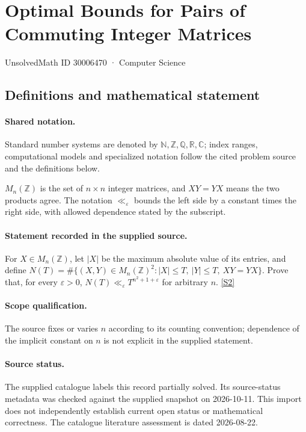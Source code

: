 \documentclass[11pt]{article}
\newcommand{\sref}[2]{\hyperlink{source:#1:#2}{[S#2]}}
\begin{document}
\setcounter{section}{30006469}
\section{Optimal Bounds for Pairs of Commuting Integer Matrices}\label{30006470}
{\small\sffamily UnsolvedMath ID 30006470 · Computer Science}
\subsection{Definitions and mathematical statement}

\paragraph{Shared notation.}Standard number systems are denoted by $\mathbb N,\mathbb Z,\mathbb Q,\mathbb R,\mathbb C$; index ranges, computational models and specialized notation follow the cited problem source and the definitions below.


$M_n(\mathbb Z)$ is the set of $n\times n$ integer matrices, and $XY=YX$ means the two products agree. The notation $\ll_\varepsilon$ bounds the left side by a constant times the right side, with allowed dependence stated by the subscript.
\paragraph{Statement recorded in the supplied source.}
For $X\in M_n(\mathbb{Z})$, let $|X|$ be the maximum absolute value of its entries, and define $N(T)=\#\{(X,Y)\in M_n(\mathbb{Z})^2:|X|\leq T,\ |Y|\leq T,\ XY=YX\}$. Prove that, for every $\varepsilon>0$, $N(T)\ll_\varepsilon T^{n^2+1+\varepsilon}$ for arbitrary $n$. \sref{30006470}{2}
\paragraph{Scope qualification.}
The source fixes or varies $n$ according to its counting convention; dependence of the implicit constant on $n$ is not explicit in the supplied statement.
\paragraph{Source status.}
The supplied catalogue labels this record partially solved. Its source-status metadata was checked against the supplied snapshot on 2026-10-11. This import does not independently establish current open status or mathematical correctness. The catalogue literature assessment is dated 2026-08-22.
\end{document}
